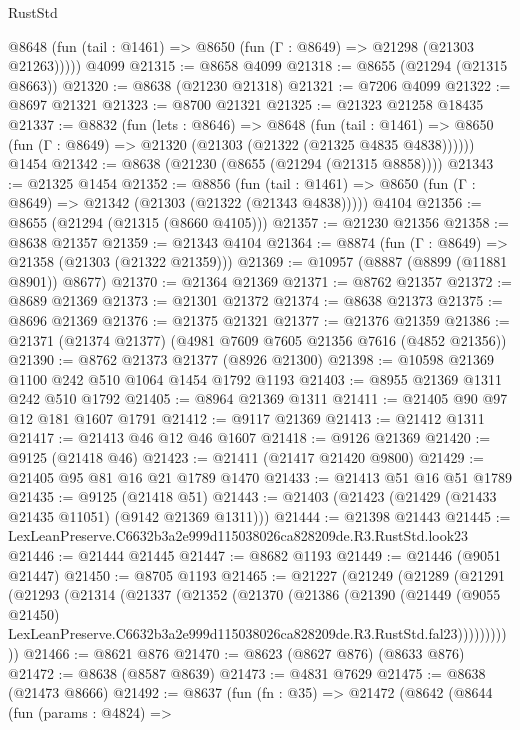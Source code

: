 \begin{lexlean}{RustStd}
\begin{coremodule}
      @8648 (fun (tail : @1461) => @8650 (fun (Γ : @8649) => @21298 (@21303 @21263)))))
    @4099
@21315 := @8658 @4099
@21318 := @8655 (@21294 (@21315 @8663))
@21320 := @8638 (@21230 @21318)
@21321 := @7206 @4099
@21322 := @8697 @21321
@21323 := @8700 @21321
@21325 := @21323 @21258 @18435
@21337 := @8832
    (fun (lets : @8646) =>
    @8648
      (fun (tail : @1461) =>
      @8650 (fun (Γ : @8649) => @21320 (@21303 (@21322 (@21325 @4835 @4838))))))
    @1454
@21342 := @8638 (@21230 (@8655 (@21294 (@21315 @8858))))
@21343 := @21325 @1454
@21352 := @8856
    (fun (tail : @1461) => @8650 (fun (Γ : @8649) => @21342 (@21303 (@21322 (@21343 @4838)))))
    @4104
@21356 := @8655 (@21294 (@21315 (@8660 @4105)))
@21357 := @21230 @21356
@21358 := @8638 @21357
@21359 := @21343 @4104
@21364 := @8874 (fun (Γ : @8649) => @21358 (@21303 (@21322 @21359)))
@21369 := @10957 (@8887 (@8899 (@11881 @8901)) @8677)
@21370 := @21364 @21369
@21371 := @8762 @21357
@21372 := @8689 @21369
@21373 := @21301 @21372
@21374 := @8638 @21373
@21375 := @8696 @21369
@21376 := @21375 @21321
@21377 := @21376 @21359
@21386 := @21371 (@21374 @21377) (@4981 @7609 @7605 @21356 @7616 (@4852 @21356))
@21390 := @8762 @21373 @21377 (@8926 @21300)
@21398 := @10598 @21369 @1100 @242 @510 @1064 @1454 @1792 @1193
@21403 := @8955 @21369 @1311 @242 @510 @1792
@21405 := @8964 @21369 @1311
@21411 := @21405 @90 @97 @12 @181 @1607 @1791
@21412 := @9117 @21369
@21413 := @21412 @1311
@21417 := @21413 @46 @12 @46 @1607
@21418 := @9126 @21369
@21420 := @9125 (@21418 @46)
@21423 := @21411 (@21417 @21420 @9800)
@21429 := @21405 @95 @81 @16 @21 @1789 @1470
@21433 := @21413 @51 @16 @51 @1789
@21435 := @9125 (@21418 @51)
@21443 := @21403 (@21423 (@21429 (@21433 @21435 @11051) (@9142 @21369 @1311)))
@21444 := @21398 @21443
@21445 := LexLeanPreserve.C6632b3a2e999d115038026ca828209de.R3.RustStd.look23
@21446 := @21444 @21445
@21447 := @8682 @1193
@21449 := @21446 (@9051 @21447)
@21450 := @8705 @1193
@21465 := @21227
    (@21249
      (@21289
        (@21291
          (@21293
            (@21314
              (@21337
                (@21352
                  (@21370
                    (@21386
                      (@21390
                        (@21449
                          (@9055 @21450)
                          LexLeanPreserve.C6632b3a2e999d115038026ca828209de.R3.RustStd.fal23)))))))))))
@21466 := @8621 @876
@21470 := @8623 (@8627 @876) (@8633 @876)
@21472 := @8638 (@8587 @8639)
@21473 := @4831 @7629
@21475 := @8638 (@21473 @8666)
@21492 := @8637
    (fun (fn : @35) =>
    @21472
      (@8642
        (@8644
          (fun (params : @4824) =>

\end{coremodule}
\end{lexlean}

